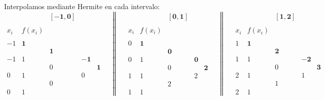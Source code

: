 \begin{ejercicio}
\begin{enumerate}
        Interpolamos mediante Hermite en cada intervalo:
        \begin{equation*}
            \begin{array}{c|cccc}
                &&\mathbf{[-1, 0]} \\ \\
                x_i & f(x_i) \\ \\
                -1 & \mathbf{1} \\
                && \mathbf{1}\\
                -1 & 1 && \mathbf{-1}\\
                && 0 && \mathbf{1}\\ 
                0 & 1 && 0\\
                && 0\\
                0 & 1
            \end{array}
            \quad \left\|\quad
            \begin{array}{c|cccc}
                &&\mathbf{[0,1]} \\ \\
                x_i & f(x_i) \\ \\
                0 & \mathbf{1} \\
                && \mathbf{0}\\
                0 & 1 && \mathbf{0}\\
                && 0 && \mathbf{2}\\ 
                1 & 1 && 2\\
                && 2\\
                1 & 1
            \end{array}\right.
            \quad \left\|\quad
            \begin{array}{c|cccc}
                &&\mathbf{[1,2]} \\ \\
                x_i & f(x_i) \\ \\
                1 & \mathbf{1} \\
                && \mathbf{2}\\
                1 & 1 && \mathbf{-2}\\
                && 0 && \mathbf{3}\\ 
                2 & 1 && 1\\
                && 1\\
                2 & 1
            \end{array}\right.
        \end{equation*}
    

\end{enumerate}
\end{ejercicio}
